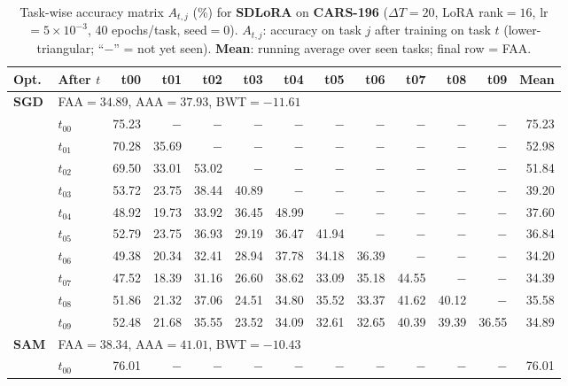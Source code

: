\begin{table}[ht]
\centering
\caption{%
  Task-wise accuracy matrix $A_{t,j}$ (\%) for \textbf{SDLoRA} on \textbf{CARS-196} ($\Delta T=20$, LoRA rank$=16$, lr$=5\times10^{-3}$, 40 epochs/task, seed$=0$).
  $A_{t,j}$: accuracy on task $j$ after training on task $t$  (lower-triangular; ``$-$'' = not yet seen).
  \textbf{Mean}: running average over seen tasks; final row = FAA.
}
\label{tab:raw_sdlora_cars196}
\setlength{\tabcolsep}{2.8pt}
\renewcommand{\arraystretch}{0.88}
\scriptsize
\begin{tabular}{@{}l l r r r r r r r r r r r@{}}
\toprule
\textbf{Opt.} & \textbf{After $t$} & \textbf{t00} & \textbf{t01} & \textbf{t02} & \textbf{t03} & \textbf{t04} & \textbf{t05} & \textbf{t06} & \textbf{t07} & \textbf{t08} & \textbf{t09} & \textbf{Mean} \\
\midrule
\multirow{11}{*}{\textbf{SGD}} & \multicolumn{12}{l}{\quad\small FAA$=34.89$,\; AAA$=37.93$,\; BWT$=-11.61$} \\
 & $t_{00}$ & 75.23 & $-$ & $-$ & $-$ & $-$ & $-$ & $-$ & $-$ & $-$ & $-$ & 75.23 \\
 & $t_{01}$ & 70.28 & 35.69 & $-$ & $-$ & $-$ & $-$ & $-$ & $-$ & $-$ & $-$ & 52.98 \\
 & $t_{02}$ & 69.50 & 33.01 & 53.02 & $-$ & $-$ & $-$ & $-$ & $-$ & $-$ & $-$ & 51.84 \\
 & $t_{03}$ & 53.72 & 23.75 & 38.44 & 40.89 & $-$ & $-$ & $-$ & $-$ & $-$ & $-$ & 39.20 \\
 & $t_{04}$ & 48.92 & 19.73 & 33.92 & 36.45 & 48.99 & $-$ & $-$ & $-$ & $-$ & $-$ & 37.60 \\
 & $t_{05}$ & 52.79 & 23.75 & 36.93 & 29.19 & 36.47 & 41.94 & $-$ & $-$ & $-$ & $-$ & 36.84 \\
 & $t_{06}$ & 49.38 & 20.34 & 32.41 & 28.94 & 37.78 & 34.18 & 36.39 & $-$ & $-$ & $-$ & 34.20 \\
 & $t_{07}$ & 47.52 & 18.39 & 31.16 & 26.60 & 38.62 & 33.09 & 35.18 & 44.55 & $-$ & $-$ & 34.39 \\
 & $t_{08}$ & 51.86 & 21.32 & 37.06 & 24.51 & 34.80 & 35.52 & 33.37 & 41.62 & 40.12 & $-$ & 35.58 \\
 & $t_{09}$ & 52.48 & 21.68 & 35.55 & 23.52 & 34.09 & 32.61 & 32.65 & 40.39 & 39.39 & 36.55 & 34.89 \\
\midrule
\multirow{11}{*}{\textbf{SAM}} & \multicolumn{12}{l}{\quad\small FAA$=38.34$,\; AAA$=41.01$,\; BWT$=-10.43$} \\
 & $t_{00}$ & 76.01 & $-$ & $-$ & $-$ & $-$ & $-$ & $-$ & $-$ & $-$ & $-$ & 76.01 \\

\end{tabular}
\end{table}
